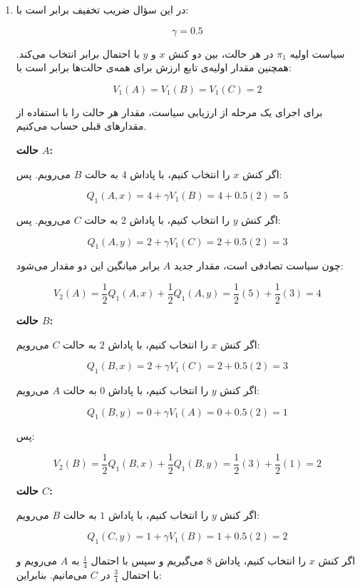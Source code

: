 \begin{enumerate}

\item[\textbf{آ)}]

در این سؤال ضریب تخفیف برابر است با:

\[
\gamma = 0.5
\]

سیاست اولیه \(\pi_1\) در هر حالت، بین دو کنش \(x\) و \(y\) با احتمال برابر انتخاب می‌کند. همچنین مقدار اولیه‌ی تابع ارزش برای همه‌ی حالت‌ها برابر است با:

\[
V_1(A)=V_1(B)=V_1(C)=2
\]

برای اجرای یک مرحله از ارزیابی سیاست، مقدار هر حالت را با استفاده از مقدارهای قبلی حساب می‌کنیم.

\medskip

\textbf{حالت \(A\):}

اگر کنش \(x\) را انتخاب کنیم، با پاداش \(4\) به حالت \(B\) می‌رویم. پس:

\[
Q_1(A,x)=4+\gamma V_1(B)=4+0.5(2)=5
\]

اگر کنش \(y\) را انتخاب کنیم، با پاداش \(2\) به حالت \(C\) می‌رویم. پس:

\[
Q_1(A,y)=2+\gamma V_1(C)=2+0.5(2)=3
\]

چون سیاست تصادفی است، مقدار جدید \(A\) برابر میانگین این دو مقدار می‌شود:

\[
V_2(A)=\frac{1}{2}Q_1(A,x)+\frac{1}{2}Q_1(A,y)
=
\frac{1}{2}(5)+\frac{1}{2}(3)=4
\]

\medskip

\textbf{حالت \(B\):}

اگر کنش \(x\) را انتخاب کنیم، با پاداش \(2\) به حالت \(C\) می‌رویم:

\[
Q_1(B,x)=2+\gamma V_1(C)=2+0.5(2)=3
\]

اگر کنش \(y\) را انتخاب کنیم، با پاداش \(0\) به حالت \(A\) می‌رویم:

\[
Q_1(B,y)=0+\gamma V_1(A)=0+0.5(2)=1
\]

پس:

\[
V_2(B)=\frac{1}{2}Q_1(B,x)+\frac{1}{2}Q_1(B,y)
=
\frac{1}{2}(3)+\frac{1}{2}(1)=2
\]

\medskip

\textbf{حالت \(C\):}

اگر کنش \(y\) را انتخاب کنیم، با پاداش \(1\) به حالت \(B\) می‌رویم:

\[
Q_1(C,y)=1+\gamma V_1(B)=1+0.5(2)=2
\]

اگر کنش \(x\) را انتخاب کنیم، پاداش \(8\) می‌گیریم و سپس با احتمال \(\frac{1}{4}\) به \(A\) می‌رویم و با احتمال \(\frac{3}{4}\) در \(C\) می‌مانیم. بنابراین:


\end{enumerate}
